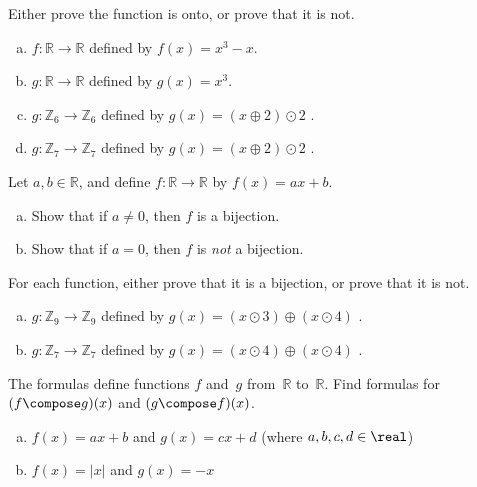 \begin{exercise}\label{exercise:TestPractice:11Exers}
Either prove the function is onto, or prove that it is not.
\begin{multicols}{2}
 \begin{enumerate}[(a)]
\item \label{11Exers-formula-f}
 $f \colon {\mathbb R} \to {\mathbb R}$ defined by $f(x) = x^3 - x$.
\item \label{11Exers-formula-g}
 $g \colon {\mathbb R} \to {\mathbb R}$ defined by $g(x) = x^3$.
\item \label{modular_g}
 $g \colon {\mathbb Z}_6 \to {\mathbb Z}_6$ defined by $g(x)= (x \oplus 2) \odot 2$ .
\item \label{modular_g}
 $g \colon {\mathbb Z}_7 \to {\mathbb Z}_7$ defined by $g(x)= (x \oplus 2) \odot 2$ .
\end{enumerate}
\end{multicols}
\end{exercise}

\begin{exercise}\label{exercise:TestPractice:LinearWhenBijectionExer}
Let $a,b \in \mathbb{R}$, and define $f \colon \mathbb{R} \to \mathbb{R}$ by $f(x) = a x + b$. 
\begin{enumerate}[(a)]
\item \label{LinearWhenBijectionExer-not0}
Show that if $a \neq 0$, then $f$ is a bijection.
\item \label{LinearWhenBijectionExer-0}
Show that if $a = 0$, then $f$ is \emph{not} a bijection.
\end{enumerate}
\end{exercise}

\begin{exercise} 
For each function, either prove that it is a bijection, or prove that it is not.
\begin{enumerate}[(a)]
\item \label{modular9}
 $g \colon {\mathbb Z}_9 \to {\mathbb Z}_9$ defined by $g(x)= (x \odot 3) \oplus  (x \odot 4)$ .
\item \label{modular_m6}
 $g \colon {\mathbb Z}_7 \to {\mathbb Z}_7$ defined by $g(x) = (x \odot 4) \oplus (x \odot 4) $ .
 \end{enumerate}
\end{exercise}

\begin{exercise}\label{exercise:TestPractice:ComposeExers-form} 
 The formulas define functions $f$ and~$g$ from~$\mathbb{R}$ to~$\mathbb{R}$. Find formulas for $(f \compose g)(x)$ and $(g \compose f)(x)$.
\begin{enumerate}[(a)]
\item \label{ComposeExers-form-(ax+b)(cx+d)}
 $f(x) = ax + b$ and $g(x) = c x + d$ (where $a,b,c,d \in \real$)
\item \label{ComposeExers-form-(|x|)(-x)}
 $f(x) = |x|$ and $g(x) = -x$ 
\end{enumerate}
\end{exercise}

